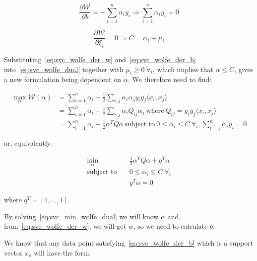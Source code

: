 \begin{equation} \label{eq:svc_wolfe_der_b}
	\frac{\partial \mathcal{W}}{\partial b}=-\sum_{i=1}^n \alpha_i y_i\Rightarrow\sum_{i=1}^n \alpha_i y_i=0
\end{equation}

\begin{equation} \label{eq:svc_wolfe_der_xi}
	\frac{\partial \mathcal{W}}{\partial\xi_i}=0\Rightarrow C=\alpha_i+\mu_i
\end{equation}

Substituting~\eqref{eq:svc_wolfe_der_w} and~\eqref{eq:svc_wolfe_der_b} into~\eqref{eq:svc_wolfe_dual} together with $\mu_i\geq 0 \ \forall_i$, which implies that $\alpha\leq C$, gives a new formulation being dependent on $\alpha$. We therefore need to find:

\begin{equation} \label{eq:svc_max_wolfe_dual}
	\begin{aligned}
    	\max_{\alpha} \mathcal{W}(\alpha) &= \sum_{i=1}^n \alpha_i - \frac{1}{2}\sum_{i,j}\alpha_i\alpha_j y_i y_j \langle x_i, x_j \rangle \\
    	&= \sum_{i=1}^n \alpha_i - \frac{1}{2}\sum_{i,j}\alpha_i Q_{ij}\alpha_j \ \text{where} \ Q_{ij} = y_i y_j \langle x_i, x_j \rangle \\
    	&= \sum_{i=1}^n \alpha_i - \frac{1}{2}\alpha^T Q\alpha \ \text{subject to} \ 0\leq\alpha_i\leq C \ \forall_i, \sum_{i=1}^n \alpha_i y_i=0 
	\end{aligned}
\end{equation}

or, equivalently:

\begin{equation} \label{eq:svc_min_wolfe_dual}
    \begin{aligned}
        \min_{\alpha} \quad & \frac{1}{2}\alpha^T Q\alpha+q^T\alpha \\
            \text{subject to} \quad & 0\leq\alpha_i\leq C \ \forall_i \\ & y^T\alpha=0
    \end{aligned}
\end{equation}

where $q^T = [1, \dots, 1]$.

By solving~\eqref{eq:svc_min_wolfe_dual} we will know $\alpha$ and, from~\eqref{eq:svc_wolfe_der_w}, we will get $w$, so we need to calculate $b$.

We know that any data point satisfying~\eqref{eq:svc_wolfe_der_b} which is a support vector $x_s$ will have the form:

